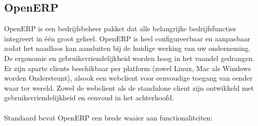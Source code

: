 \subsection{OpenERP}
OpenERP is een bedrijfsbeheer pakket dat alle belangrijke bedrijfsfuncties integreert in \'e\'en groot geheel. OpenERP is heel configureerbaar en aanpasbaar zodat het naadloos kan aansluiten bij de huidige werking van uw onderneming. De ergonomie en gebruiksvriendelijkheid worden hoog in het vaandel gedrangen. Er zijn aparte clients beschikbaar per platform (zowel Linux, Mac als Windows worden Ondersteunt), alsook een webclient voor eenvoudige toegang van eender waar ter wereld. Zowel de webclient als de standalone client zijn ontwikkeld met gebruiksvriendelijkheid en eenvoud in het achterhoofd.\\\\
%
Standaard bevat OpenERP een brede waaier aan functionaliteiten:
